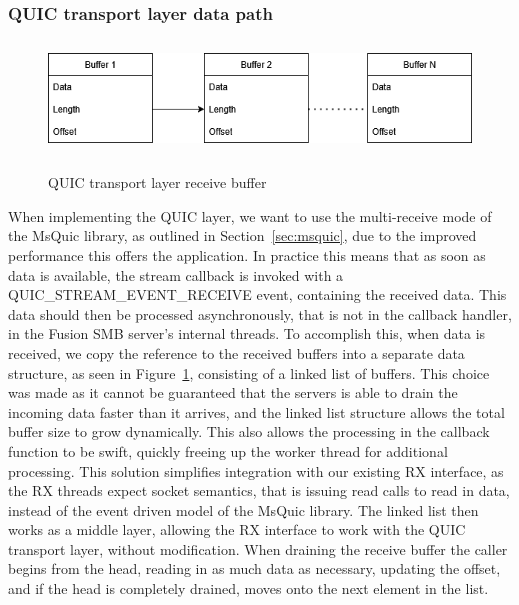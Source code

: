 \documentclass[english, 12pt, a4paper, elec, utf8, a-2b, online]{aaltothesis}
\begin{document}
\subsubsection{QUIC transport layer data path}
\begin{figure}[h]
	\centering
	\includegraphics[alt={Block diagram of the receive buffer of the QUIC layer}, height=3cm]{./images/quic_buffer.png}
	\caption{QUIC transport layer receive buffer}
	\label{fig:msquic_buf}
\end{figure}

When implementing the QUIC layer, we want to use the multi-receive mode of the MsQuic
library, as outlined in Section~\ref{sec:msquic}, due to the improved performance
this offers the application. In practice this means that as soon as data is available,
the stream callback is invoked with a QUIC\_STREAM\_EVENT\_RECEIVE event, containing
the received data. This data should then be processed asynchronously, that is not in
the callback handler, in the Fusion SMB server's internal threads. To accomplish this,
when data is received, we copy the reference to the received buffers into a separate
data structure, as seen in Figure~\ref{fig:msquic_buf}, consisting of a linked list
of buffers. This choice was made as it cannot be guaranteed that the servers is able to drain 
the incoming data faster than it arrives, and the linked list structure allows
the total buffer size to grow dynamically. This also allows the processing in the
callback function to be swift, quickly freeing up the worker thread for additional processing.
This solution simplifies integration with our existing RX interface, as the RX threads
expect socket semantics, that is issuing read calls to read in data, instead of the
event driven model of the MsQuic library. The linked list then works as a middle
layer, allowing the RX interface to work with the QUIC transport layer, without modification.
When draining the receive buffer the caller begins from the head, reading in as
much data as necessary, updating the offset, and if the head is completely drained,
moves onto the next element in the list.
\end{document}
